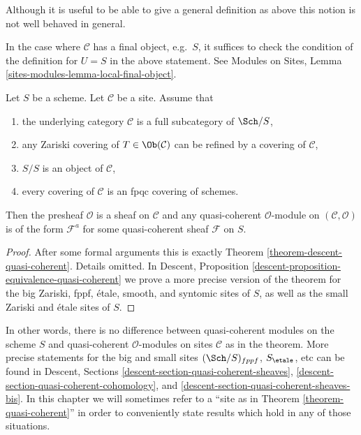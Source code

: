 \noindent
Although it is useful to be able to give a general definition as above
this notion is not well behaved in general.

\begin{remark}
\label{remark-final-object}
In the case where $\mathcal{C}$ has a final object, e.g.\ $S$, it
suffices to check the condition of the definition for
$U = S$ in the above statement. See
Modules on Sites, Lemma \ref{sites-modules-lemma-local-final-object}.
\end{remark}

\begin{theorem}
\label{theorem-quasi-coherent}
Let $S$ be a scheme.
Let $\mathcal{C}$ be a site. Assume that
\begin{enumerate}
\item the underlying category $\mathcal{C}$ is a
full subcategory of $\Sch/S$,
\item any Zariski covering of $T \in \Ob(\mathcal{C})$
can be refined by a covering of $\mathcal{C}$,
\item $S/S$ is an object of $\mathcal{C}$,
\item every covering of $\mathcal{C}$ is an fpqc covering of schemes.
\end{enumerate}
Then the presheaf $\mathcal{O}$ is a sheaf on $\mathcal{C}$ and
any quasi-coherent $\mathcal{O}$-module on $(\mathcal{C}, \mathcal{O})$
is of the form $\mathcal{F}^a$ for some quasi-coherent sheaf
$\mathcal{F}$ on $S$.
\end{theorem}

\begin{proof}
After some formal arguments this is exactly Theorem
\ref{theorem-descent-quasi-coherent}. Details omitted. In
Descent, Proposition \ref{descent-proposition-equivalence-quasi-coherent}
we prove a more precise version of the theorem for the
big Zariski, fppf, \'etale, smooth, and syntomic sites of $S$,
as well as the small Zariski and \'etale sites of $S$.
\end{proof}

\noindent
In other words, there is no difference between quasi-coherent
modules on the scheme $S$ and quasi-coherent $\mathcal{O}$-modules
on sites $\mathcal{C}$ as in the theorem. More precise statements
for the big and small sites $(\Sch/S)_{fppf}$, $S_\etale$, etc
can be found in Descent, Sections
\ref{descent-section-quasi-coherent-sheaves},
\ref{descent-section-quasi-coherent-cohomology}, and
\ref{descent-section-quasi-coherent-sheaves-bis}.
In this chapter we will sometimes refer to a
``site as in Theorem \ref{theorem-quasi-coherent}''
in order to conveniently state results which hold in any of those
situations.






